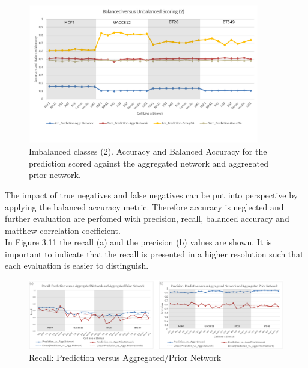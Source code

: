 \begin{figure}[H]
\captionsetup{width=0.9\linewidth}
\centering
\includegraphics[width=0.9\textwidth]{./Bilder/Scoring/dreamchallenge/1_Balanced_vs_Unbalanced/balanced2.pdf}
\caption[Imbalanced classes (2)]{Imbalanced classes (2). Accuracy and Balanced Accuracy for the prediction scored against the aggregated network and aggregated prior network.}
\label{fig:10}
\end{figure}

The impact of true negatives and false negatives can be put into perspective by applying the balanced accuracy metric. Therefore accuracy is neglected and further evaluation are perfomed with precision, recall, balanced accuracy and matthew correlation coefficient.\\


In Figure 3.11 the recall (a) and the precision (b) values are shown. It is important to indicate that the recall is presented in a higher resolution such that each evaluation is easier to distinguish.\\


\begin{figure}[H]
\captionsetup{width=0.9\linewidth}
\centering
\includegraphics[width=1.0\textwidth]{./Bilder/Scoring/dreamchallenge/1_Balanced_vs_Unbalanced/balanced_recprec.pdf}
\caption[Recall: Prediction versus Aggregated/Prior Network]{Recall: Prediction versus Aggregated/Prior Network}
\label{fig:10}
\end{figure} 

